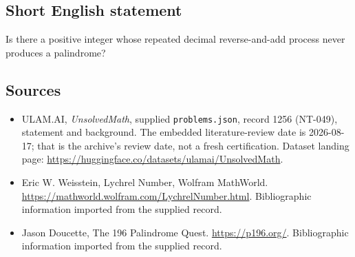 \documentclass[11pt,a4paper]{article}
\begin{document}
\subsection{Short English statement}

Is there a positive integer whose repeated decimal reverse-and-add process never produces a palindrome?

\subsection{Sources}

{\small

\begin{itemize}

\item[\hypertarget{source:1256:1}{S1}] ULAM.AI, \emph{UnsolvedMath}, supplied \texttt{problems.json}, record 1256 (NT-049), statement and background. The embedded literature-review date is 2026-08-17; that is the archive’s review date, not a fresh certification. Dataset landing page: \url{https://huggingface.co/datasets/ulamai/UnsolvedMath}.

\item[\hypertarget{source:1256:2}{S2}] Eric W. Weisstein, Lychrel Number, Wolfram MathWorld. \url{https://mathworld.wolfram.com/LychrelNumber.html}. Bibliographic information imported from the supplied record.

\item[\hypertarget{source:1256:3}{S3}] Jason Doucette, The 196 Palindrome Quest. \url{https://p196.org/}. Bibliographic information imported from the supplied record.

\end{itemize}

}

\label{end:1256}
\end{document}
